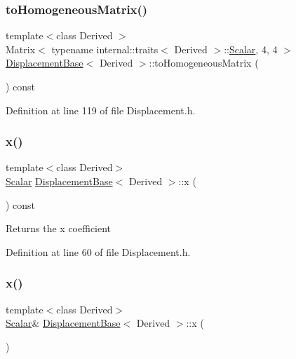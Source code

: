 \subsubsection{\texorpdfstring{to\+Homogeneous\+Matrix()}{toHomogeneousMatrix()}}
{\footnotesize\ttfamily template$<$class Derived $>$ \\
Matrix$<$ typename internal\+::traits$<$ Derived $>$\+::\hyperlink{class_displacement_base_a978caf313131fd9d221a856a2e4a80ad}{Scalar}, 4, 4 $>$ \hyperlink{class_displacement_base}{Displacement\+Base}$<$ Derived $>$\+::to\+Homogeneous\+Matrix (\begin{DoxyParamCaption}{ }\end{DoxyParamCaption}) const}



Definition at line 119 of file Displacement.\+h.

\hypertarget{class_displacement_base_ae2b6ce0d58e72f8d36942204303960c1}{}\label{class_displacement_base_ae2b6ce0d58e72f8d36942204303960c1} 
\subsubsection{\texorpdfstring{x()}{x()}\hspace{0.1cm}{\footnotesize\ttfamily [1/2]}}
{\footnotesize\ttfamily template$<$class Derived$>$ \\
\hyperlink{class_displacement_base_a978caf313131fd9d221a856a2e4a80ad}{Scalar} \hyperlink{class_displacement_base}{Displacement\+Base}$<$ Derived $>$\+::x (\begin{DoxyParamCaption}{ }\end{DoxyParamCaption}) const\hspace{0.3cm}{\ttfamily [inline]}}

\begin{DoxyReturn}{Returns}
the {\ttfamily x} coefficient 
\end{DoxyReturn}


Definition at line 60 of file Displacement.\+h.

\hypertarget{class_displacement_base_a1f29ca444e3e267eb8984cde3173d4e5}{}\label{class_displacement_base_a1f29ca444e3e267eb8984cde3173d4e5} 
\subsubsection{\texorpdfstring{x()}{x()}\hspace{0.1cm}{\footnotesize\ttfamily [2/2]}}
{\footnotesize\ttfamily template$<$class Derived$>$ \\
\hyperlink{class_displacement_base_a978caf313131fd9d221a856a2e4a80ad}{Scalar}\& \hyperlink{class_displacement_base}{Displacement\+Base}$<$ Derived $>$\+::x (\begin{DoxyParamCaption}{ }\end{DoxyParamCaption})\hspace{0.3cm}{\ttfamily [inline]}}


